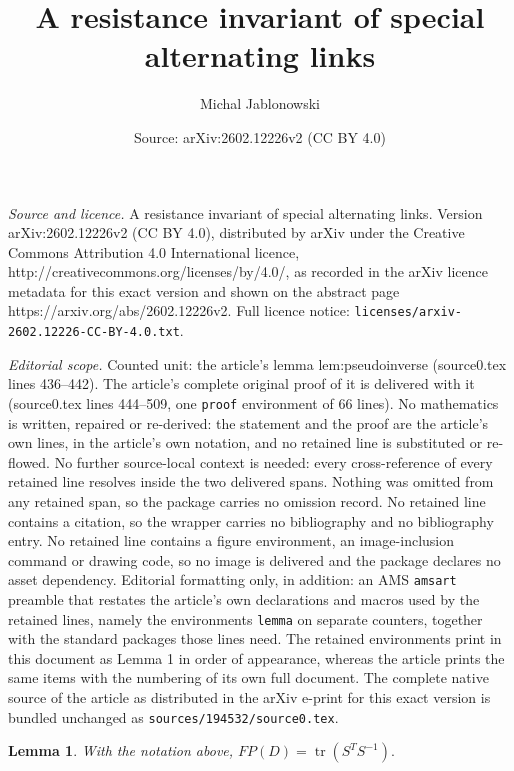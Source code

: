 \documentclass[10pt,a4paper]{amsart}
\title{A resistance invariant of special alternating links}
\author{Michal Jablonowski}
\date{Source: arXiv:2602.12226v2 (CC BY 4.0)}
\newtheorem{lemma}{Lemma}
\begin{document}
\maketitle

\noindent\emph{Source and licence.} A resistance invariant of special alternating links. Version arXiv:2602.12226v2 (CC BY 4.0), distributed by arXiv under the Creative Commons Attribution 4.0 International licence, http://creativecommons.org/licenses/by/4.0/, as recorded in the arXiv licence metadata for this exact version and shown on the abstract page https://arxiv.org/abs/2602.12226v2. Full licence notice: \texttt{licenses/arxiv-2602.12226-CC-BY-4.0.txt}.\par\smallskip

\noindent\textit{Editorial scope.} Counted unit: the article's lemma lem:pseudoinverse (source0.tex lines 436--442). The article's complete original proof of it is delivered with it (source0.tex lines 444--509, one \texttt{proof} environment of 66 lines). No mathematics is written, repaired or re-derived: the statement and the proof are the article's own lines, in the article's own notation, and no retained line is substituted or re-flowed.  No further source-local context is needed: every cross-reference of every retained line resolves inside the two delivered spans.  Nothing was omitted from any retained span, so the package carries no omission record.  No retained line contains a citation, so the wrapper carries no bibliography and no bibliography entry.  No retained line contains a figure environment, an image-inclusion command or drawing code, so no image is delivered and the package declares no asset dependency.  Editorial formatting only, in addition: an AMS \texttt{amsart} preamble that restates the article's own declarations and macros used by the retained lines, namely the environments \texttt{lemma} on separate counters, together with the standard packages those lines need.  The retained environments print in this document as Lemma 1 in order of appearance, whereas the article prints the same items with the numbering of its own full document.  The complete native source of the article as distributed in the arXiv e-print for this exact version is bundled unchanged as \texttt{sources/194532/source0.tex}.
\begin{lemma}
	\label{lem:pseudoinverse}
	With the notation above,
	$
	FP(D)=\operatorname{tr}(S^T S^{-1}).
	$
\end{lemma}
\end{document}
